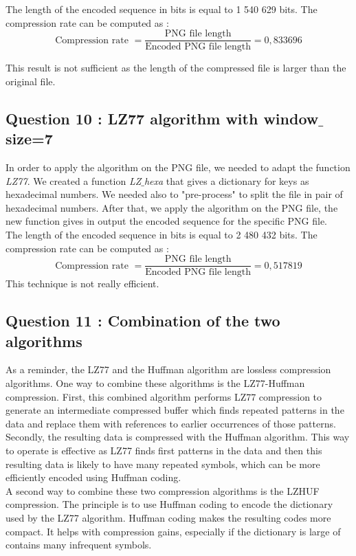 \documentclass[titlepage]{article}
\begin{document}
The length of the encoded sequence in bits is equal to 1 540 629 bits. The compression rate can be computed as : 
$$ \text{Compression rate } = \frac{\text{PNG file length}}{\text{Encoded PNG file length}} = 0,833696$$

This result is not sufficient as the length of the compressed file is larger than the original file.

\subsection{Question 10 : LZ77 algorithm with window$\_$size=7}

In order to apply the algorithm on the PNG file, we needed to adapt the function \textit{LZ77}. We created a function \textit{LZ$\_$hexa} that gives a dictionary for keys as hexadecimal numbers. We needed also to "pre-process" to split the file in pair of hexadecimal numbers. After that, we apply the algorithm on the PNG file, the new function gives in output the encoded sequence for the specific PNG file. \\

The length of the encoded sequence in bits is equal to 2 480 432 bits. 
The compression rate can be computed as : 
$$ \text{Compression rate } = \frac{\text{PNG file length}}{\text{Encoded PNG file length}} = 0,517819$$
This technique is not really efficient. 

\subsection{Question 11 : Combination of the two algorithms} 

As a reminder, the LZ77 and the Huffman algorithm are lossless compression algorithms. One way to combine these algorithms is the LZ77-Huffman compression. First, this combined algorithm performs LZ77 compression to generate an intermediate compressed buffer which finds repeated patterns in the data and replace them with references to earlier occurrences of those patterns. Secondly, the resulting data is compressed with the Huffman algorithm. This way to operate is effective as LZ77 finds first patterns in the data and then this resulting data is likely to have many repeated symbols, which can be more efficiently encoded using Huffman coding. \\

A second way to combine these two compression algorithms is the LZHUF compression. The principle is to use Huffman coding to encode the dictionary used by the LZ77 algorithm. Huffman coding makes the resulting codes more compact. It helps with compression gains, especially if the dictionary is large of contains many infrequent symbols.  \\
\end{document}
